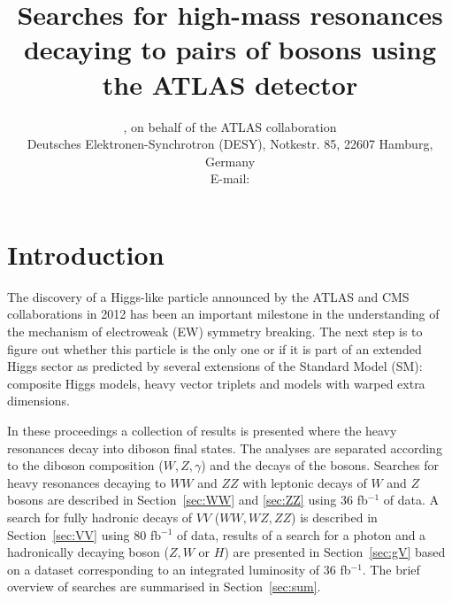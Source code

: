 \documentclass{PoS}
\title{Searches for high-mass resonances decaying to pairs of bosons using the ATLAS detector}
\author{\speaker{Kirill Grevtsov}, {on behalf of the ATLAS collaboration}\\%
        Deutsches Elektronen-Synchrotron (DESY), Notkestr. 85, 22607 Hamburg, Germany\\
        E-mail: \email{kirill.grevtsov@cern.ch}}
\begin{document}
\linenumbers


\section{Introduction}

The discovery of a Higgs-like particle announced by the ATLAS and CMS collaborations in 2012 \cite{HIGG-2012-27,CMS-HIG-12-028} has been an important milestone in the understanding of the mechanism of electroweak (EW) symmetry breaking. %
The next step is to figure out whether this particle is the only one or if it is part of an extended Higgs sector as predicted by several extensions of the Standard Model (SM): composite Higgs models, heavy vector triplets and models with warped extra dimensions.


In these proceedings a collection of results is presented where the heavy resonances decay into diboson final states. 
The analyses are separated according to the diboson composition ($W,Z, \gamma$) and the decays of the bosons. 
Searches for heavy resonances decaying to $WW$ and $ZZ$ with leptonic decays of $W$ and $Z$ bosons are described in Section~\ref{sec:WW} and \ref{sec:ZZ} using 36 fb$^{-1}$ of data.
A search for fully hadronic decays of $VV$ ($WW, WZ, ZZ$) is described in Section~\ref{sec:VV} using 80 fb$^{-1}$ of data, results of a search for a photon and a hadronically decaying boson ($Z,W$ or $H$) are presented in Section~\ref{sec:gV} based on a dataset corresponding to an integrated luminosity of 36 fb$^{-1}$. 
The brief overview of searches are summarised in Section~\ref{sec:sum}.

\end{document}
